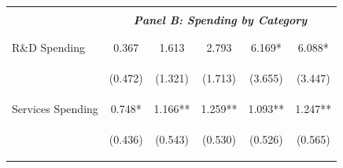 \documentclass[dv_diss_main.tex]{subfiles}
\begin{document}
\begin{table}[H]
\begin{center}
\begin{tabular}{lccccc}
    \cmidrule{2-6}
    \vspace{-1.5pt} & \vspace{-1.5pt} & \vspace{-1.5pt} & \vspace{-1.5pt} & \vspace{-1.5pt} \\
    & \multicolumn{5}{c}{\textit{\textbf{Panel B: Spending by Category}}} \\ 
    \vspace{-1.5pt} & \vspace{-1.5pt} & \vspace{-1.5pt} & \vspace{-1.5pt} & \vspace{-1.5pt} \\ 
    \cmidrule{2-6}
    \vspace{-1.5pt} & \vspace{-1.5pt} & \vspace{-1.5pt} & \vspace{-1.5pt} & \vspace{-1.5pt} \\
    R\&D Spending & 0.367 & 1.613 & 2.793 & 6.169* & 6.088* \\
    \vspace{4pt} & \begin{footnotesize}(0.472)\end{footnotesize} & \begin{footnotesize}(1.321)\end{footnotesize} & \begin{footnotesize}(1.713)\end{footnotesize} & \begin{footnotesize}(3.655)\end{footnotesize} & \begin{footnotesize}(3.447)\end{footnotesize} \\
    Services Spending & 0.748* & 1.166** & 1.259** & 1.093** & 1.247** \\
    \vspace{4pt} & \begin{footnotesize}(0.436)\end{footnotesize} & \begin{footnotesize}(0.543)\end{footnotesize} & \begin{footnotesize}(0.530)\end{footnotesize} & \begin{footnotesize}(0.526)\end{footnotesize} & \begin{footnotesize}(0.565)\end{footnotesize} \\

\end{tabular}
\end{center}
\end{table}
\end{document}
